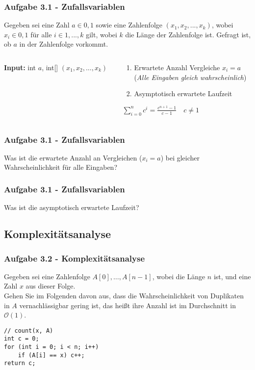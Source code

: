 \documentclass{beamer}
\begin{document}
\begin{frame}
	\frametitle{Aufgabe 3.1 - Zufallsvariablen}

	Gegeben sei eine Zahl $a \in {0, 1}$ sowie eine Zahlenfolge $(x_1, x_2, . . . , x_k)$, wobei $x_i \in {0, 1}$
	für alle $i \in {1, . . . , k}$ gilt, wobei $k$ die Länge der Zahlenfolge ist. Gefragt ist, ob $a$ in der
	Zahlenfolge vorkommt.

	\begin{columns}[T]

		\begin{column}{.50\textwidth}
			\textbf{Input:} int $a$, int[] $(x_1, x_2, \dots, x_k)$
			\begin{algorithmic}[1]
				\EndIf{}
				\EndWhile{}
			\end{algorithmic}
		\end{column}
		\begin{column}{.48\textwidth}
			\begin{enumerate}
				\item Erwartete Anzahl Vergleiche $x_i = a$ \\
				      (\textit{Alle Eingaben gleich wahrscheinlich})
				\item Asymptotisch erwartete Laufzeit
			\end{enumerate}
			\medskip
			$\sum_{i=0}^{n} c^i = \frac{c^{n+1}-1}{c-1} \quad c \neq 1$
		\end{column}
	\end{columns}
\end{frame}

\begin{frame}[t]
	\frametitle{Aufgabe 3.1 - Zufallsvariablen}
	Was ist die erwartete Anzahl an Vergleichen ($x_i = a$) bei gleicher Wahrscheinlichkeit für alle Eingaben?
\end{frame}

\begin{frame}[t]
	\frametitle{Aufgabe 3.1 - Zufallsvariablen}
	Was ist die asymptotisch erwartete Laufzeit?
\end{frame}

\subsection{Komplexitätsanalyse}
\begin{frame}[fragile]
	\frametitle{Aufgabe 3.2 - Komplexitätsanalyse}
	Gegeben sei eine Zahlenfolge $A[0], \dots, A[n - 1]$, wobei die Länge $n$ ist, und eine Zahl $x$ aus
	dieser Folge. \\
	Gehen Sie im Folgenden davon aus, dass die Wahrscheinlichkeit von Duplikaten
	in $A$ vernachlässigbar gering ist, das heißt ihre Anzahl ist im Durchschnitt in $\mathcal{O}(1)$.

	\medskip
	\begin{verbatim}
// count(x, A)
int c = 0;
for (int i = 0; i < n; i++)
	if (A[i] == x) c++;
return c;
	\end{verbatim}
\end{frame}
\end{document}
